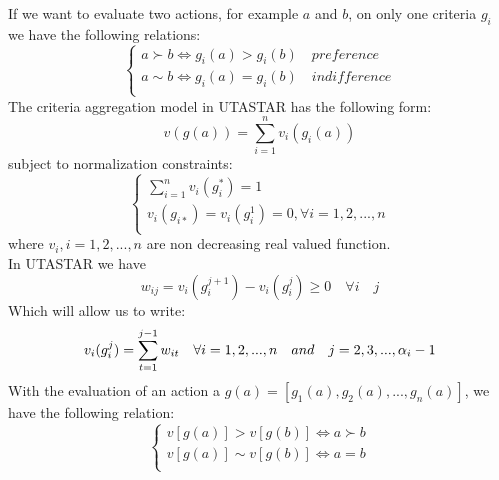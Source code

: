 \documentclass{report}
\begin{document}
If we want to evaluate two actions, for example $a$ and $b$, on only one criteria $g_i$ we have the following relations: 
\begin{equation}
      \begin{cases}
      	a \succ b\Leftrightarrow g_i(a) > g_i(b) \quad preference\\
      	a\sim b \Leftrightarrow g_i(a) = g_i(b) \quad indifference \\
      \end{cases}
\end{equation}
The criteria aggregation model in UTASTAR has the following form:
\begin{equation}\label{eq1}
      v(g(a)) = \sum_{i=1}^{n} v_i (g_i (a))
\end{equation}
subject to normalization constraints:\\
\begin{equation}\label{eq2}
      \begin{cases}
      	\sum_{i=1}^{n} v_i(g_{i}^{*}) = 1\\
       	v_i(g_{i*})= v_i(g_i^1)  = 0,  \forall i = 1, 2, ..., n\\
      \end{cases}
\end{equation}
where $ v_i, i = 1,2,...,n$ are non decreasing real valued function.\\
In UTASTAR we have 
\begin{equation}
	w_{ij} = v_i(g_i^{j+1}) - v_i(g_i^{j}) \geq 0 \quad \forall i \quad j 
\end{equation}
Which will allow us to write: 
\begin{equation}
	v_i(g_i^j) =	  \sum_{t=1}^{j-1} w_{it} \quad \forall i = 1,2,...,n \quad and \quad j = 2,3,...,\alpha _i -1 \\
\end{equation}
With the evaluation of an action a $g(a) = [g_1(a) ,  g_2(a) , ... , g_n(a)] $, we have the following relation:
\begin{equation}
      \begin{cases}
      	v[g(a)] > v[g(b)] \Leftrightarrow a \succ b\\
      	v[g(a)] \sim v[g(b)] \Leftrightarrow a = b\\
      \end{cases}
\end{equation}

\newpage
\end{document}
